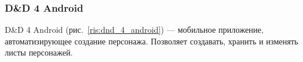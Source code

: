 \subsubsection{D\&D 4 Android}
D\&D 4 Android (рис.~\ref{ris:dnd_4_android}) --- мобильное приложение, автоматизирующее создание персонажа. Позволяет создавать, хранить и изменять листы персонажей.

\begin{figure}[!h]
\begin{minipage}[h]{0.49\linewidth}
\end{minipage}
\begin{minipage}[h]{0.49\linewidth}

\end{minipage}
\end{figure}

